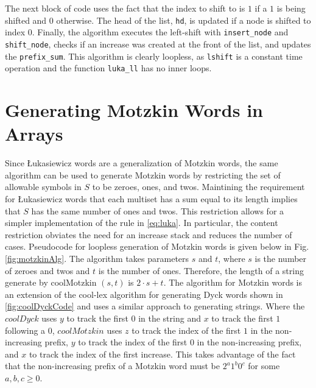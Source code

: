 The next block of code uses the fact that the index to shift to is $1$ if a $1$ is being shifted and $0$ otherwise.  The head of the list, \verb$hd$, is updated if a node is shifted to index 0.  Finally, the algorithm executes the left-shift with \verb$insert_node$ and \verb$shift_node$, checks if an increase was created at the front of the list, and updates the \verb$prefix_sum$.  This algorithm is clearly loopless, as \verb$lshift$ is a constant time operation and the function \verb$luka_ll$ has no inner loops.

\section{Generating Motzkin Words in Arrays}\label{sec:coolMotz}
Since Łukasiewicz words are a generalization of Motzkin words, the same algorithm can be used to generate Motzkin words by restricting the set of allowable symbols in $S$ to be zeroes, ones, and twos. Maintining the requirement for Łukasiewicz words that each multiset has a sum equal to its length implies that $S$ has the same number of ones and twos.  This restriction allows for a simpler implementation of the rule in \eqref{eq:luka}.  In particular, the content restriction obviates the need for an increase stack and reduces the number of cases.   Pseudocode for loopless generation of Motzkin words is given below in Fig. \ref{fig:motzkinAlg}.
The algorithm takes parameters $s$ and $t$, where $s$ is the number of zeroes and twos and $t$ is the number of ones.  Therefore, the length of a string generate by coolMotzkin $(s,t)$ is $2\cdot s + t$.
The algorithm for Motzkin words is an extension of the cool-lex algorithm for generating Dyck words shown in \ref{fig:coolDyckCode} and uses a similar approach to generating strings.
Where the $coolDyck$ uses $y$ to track the first $0$ in the string and $x$ to track the first $1$ following a $0$, $coolMotzkin$ uses $z$ to track the index of the first $1$ in the non-increasing prefix, $y$ to track the index of the first $0$ in the non-increasing prefix, and $x$ to track the index of the first increase.  This takes advantage of the fact that the non-increasing prefix of a Motzkin word must be $2^a1^b0^c$ for some $a,b,c \ge 0$.


